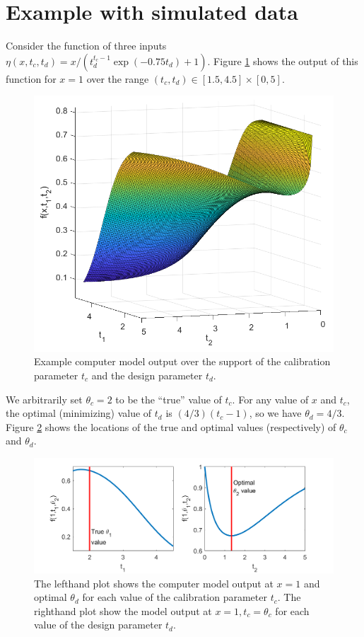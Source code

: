 \documentclass[12pt]{article}
\begin{document}
%
\section{Example with simulated data}
%
Consider the function of three inputs $\eta(x,t_c,t_d) = x / (t_d^{t_c-1}\exp(-0.75t_d)+1)$. 
%
Figure \ref{fig:example_output} shows the output of this function for $x=1$ over the range $(t_c,t_d)\in[1.5,4.5]\times[0,5]$.
%
\begin{figure}
\centering
\includegraphics[scale=0.85]{FIG_obj_fn}
\captionsetup{width=.85\linewidth}
\caption{Example computer model output over the support of the calibration parameter $t_c$ and the design parameter $t_d$.}
\label{fig:example_output}
\end{figure}
%
We arbitrarily set $\theta_c=2$ to be the ``true'' value of $t_c$.
%
For any value of $x$ and $t_c$, the optimal (minimizing) value of $t_d$ is $(4/3)(t_c-1)$, so we have $\theta_d=4/3.$
%
Figure \ref{fig:true_vals} shows the locations of the true and optimal values (respectively) of $\theta_c$ and $\theta_d$.
%
\begin{figure}
\centering
\includegraphics[scale=0.85]{FIG_true_optimal_theta1_theta2}
 	\captionsetup{width=.85\linewidth}
\caption{The lefthand plot shows the computer model output at $x=1$ and optimal $\theta_d$ for each value of the calibration parameter $t_c$. The righthand plot show the model output at $x=1,t_c=\theta_c$ for each value of the design parameter $t_d$.}
\label{fig:true_vals}
\end{figure}
\end{document}
